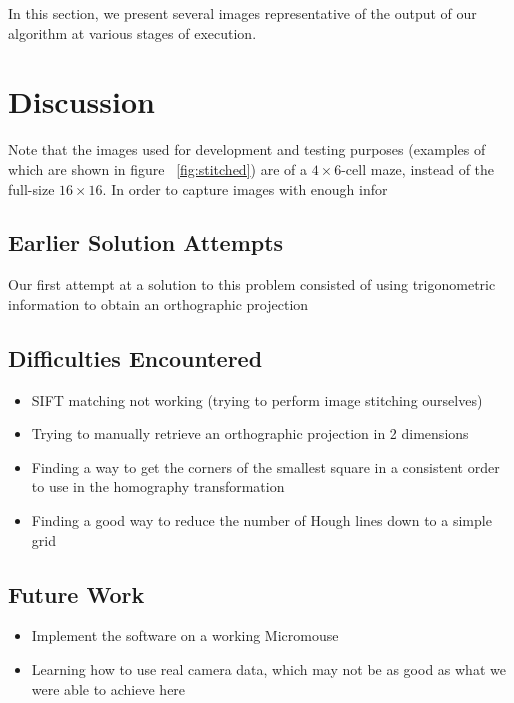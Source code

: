 \documentclass[10pt,twocolumn,letterpaper]{article}
\begin{document}
In this section, we present several images representative of the output of our algorithm at various stages of execution.


\section{Discussion}

Note that the images used for development and testing purposes (examples of which are shown in figure
~\ref{fig:stitched}) are of a $4\times 6$-cell maze, instead of the full-size $16\times 16$.  In order to capture images
with enough infor

\label{sec:discussion}
\subsection{Earlier Solution Attempts}
\label{sub:earlierattempts}

Our first attempt at a solution to this problem consisted of using trigonometric information to obtain an orthographic projection 

\subsection{Difficulties Encountered}
\label{sub:difficulties}
\begin{itemize}
	\item SIFT matching not working (trying to perform image stitching ourselves)
	\item Trying to manually retrieve an orthographic projection in 2 dimensions
	\item Finding a way to get the corners of the smallest square in a consistent order to use in the homography
	transformation
	\item Finding a good way to reduce the number of Hough lines down to a simple grid
\end{itemize}

\subsection{Future Work}
\label{sub:futurework}
\begin{itemize}
	\item Implement the software on a working Micromouse
	\item Learning how to use real camera data, which may not be as good as what we were able to achieve here
\end{itemize}

{\small


}
\end{document}
